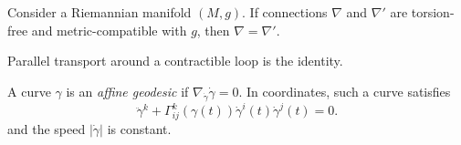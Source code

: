 \documentclass{homework}
\begin{document}
\begin{problem}
  Consider a Riemannian manifold $(M,g)$.  If connections $\nabla$ and $\nabla'$ are torsion-free and metric-compatible with $g$, then $\nabla = \nabla'$.
\end{problem}

\begin{problem}
  Parallel transport around a contractible loop is the identity.
\end{problem}

\begin{problem}
A curve $\gamma$ is an \emph{affine geodesic} if $\nabla_{\dot\gamma}\dot\gamma=0$.
In coordinates, such a curve satisfies
\[
\ddot\gamma^k+\Gamma^k_{ij}(\gamma(t))\dot\gamma^i(t)\dot\gamma^j(t)=0.
\]
and the speed $|\dot\gamma|$ is constant.
\end{problem}
\end{document}

